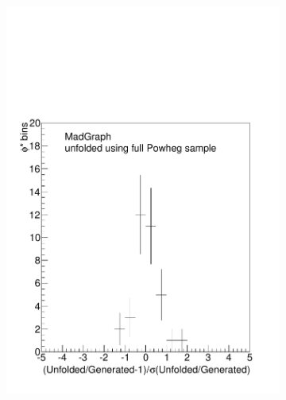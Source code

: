 \begin{figure}[!htbp]
\begin{subfigure}[b]{\SideBySidePlotWidth}
        \includegraphics[width=\textwidth]{figures/Pull_ALL.pdf}
        \caption{}
        \label{fig:pull_all}
    \end{subfigure}
    \begin{subfigure}[b]{\SideBySidePlotWidth}

\end{subfigure}
\end{figure}
